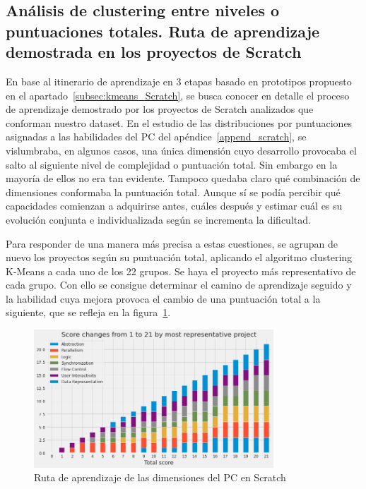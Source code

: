 \documentclass[a4paper, 12pt]{book}
\begin{document}
\subsection{Análisis de clustering entre niveles o puntuaciones totales. Ruta de aprendizaje demostrada en los proyectos de Scratch}
\label{subsec:ruta_Scratch}

En base al itinerario de aprendizaje en 3 etapas basado en prototipos propuesto en el apartado~\ref{subsec:kmeans_Scratch}, se  busca conocer en detalle el proceso de aprendizaje demostrado por los proyectos de Scratch analizados que conforman nuestro dataset. 
En el estudio de las distribuciones por puntuaciones asignadas a las habilidades del PC del apéndice~\ref{append_scratch}, se vislumbraba, en algunos casos, una única dimensión cuyo desarrollo provocaba el salto al siguiente nivel de complejidad o puntuación total. Sin embargo en la mayoría de ellos no era tan evidente. Tampoco quedaba claro qué combinación de dimensiones conformaba la puntuación total. 
Aunque sí se podía percibir qué capacidades comienzan a adquirirse antes, cuáles después y estimar cuál es su evolución conjunta e individualizada según se incrementa la dificultad.

Para responder de una manera más precisa a estas cuestiones, se agrupan de nuevo los proyectos según su puntuación total, aplicando el algoritmo clustering K-Means a cada uno de los 22 grupos. Se haya el proyecto más representativo de cada grupo. 
Con ello se consigue determinar el camino de aprendizaje seguido y la habilidad cuya mejora provoca el cambio de una puntuación total a la siguiente, que se refleja en la figura~\ref{fig:path_Scratch}.


\begin{figure}[H]
    \centering
    \includegraphics[width=0.8\textwidth]{img/path_CT_Scratch1.png}
    \caption{Ruta de aprendizaje de las dimensiones del PC en Scratch}\label{fig:path_Scratch}
\end{figure}
\end{document}
